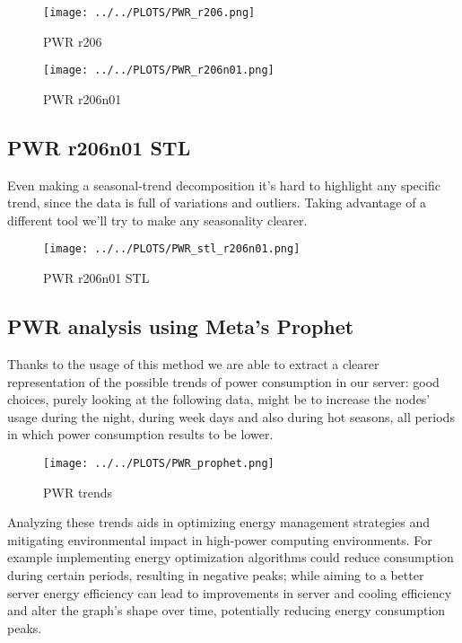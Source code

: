 \vspace{-12pt}

\begin{figure}[H]
\centering
\texttt{[image: ../../PLOTS/PWR\_r206.png]}
\captionsetup{skip=-10pt}
\caption{PWR r206}
\label{fig:PWR_r206}
\end{figure}

\vspace{-20pt}

\begin{figure}[H]
\centering
\texttt{[image: ../../PLOTS/PWR\_r206n01.png]}
\captionsetup{skip=-10pt}
\caption{PWR r206n01}
\label{fig:PWR_r206n01}
\end{figure}

\subsection{PWR r206n01 STL}
Even making a seasonal-trend decomposition it’s hard to highlight any specific trend, since the data is full of variations and outliers. Taking advantage of a different tool we’ll try to make any seasonality clearer.

\vspace{-10pt}

\begin{figure}[H]
\centering
\texttt{[image: ../../PLOTS/PWR\_stl\_r206n01.png]}
\caption{PWR r206n01 STL}
\label{fig:PWR_stl_r206n01}
\end{figure}

\subsection{PWR analysis using Meta's Prophet}
Thanks to the usage of this method we are able to extract a clearer representation of the possible trends of power consumption in our server:
good choices, purely looking at the following data, might be to increase the nodes' usage during the night, during week days and also during hot seasons, all periods in which power consumption results to be lower. 

\vspace{-10pt}

\begin{figure}[H]
\centering
\texttt{[image: ../../PLOTS/PWR\_prophet.png]}
\caption{PWR trends}
\label{fig:PWR_prophet}
\end{figure}

Analyzing these trends aids in optimizing energy management strategies and mitigating environmental impact in high-power computing environments.
For example implementing energy optimization algorithms could reduce consumption during certain periods, resulting in negative peaks;
while aiming to a better server energy efficiency can lead to improvements in server and cooling efficiency and alter the graph's shape over time, potentially reducing energy consumption peaks.